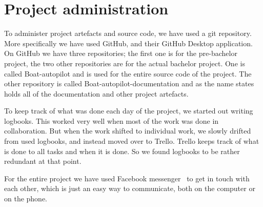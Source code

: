 \chapter{Project administration}
To administer project artefacts and source code, we have used a git repository. More specifically we have used GitHub\cite{github}, and their GitHub Desktop application\cite{github_desktop}. On GitHub we have three repositories; the first one is for the pre-bachelor project, the two other repositories are for the actual bachelor project. One is called Boat-autopilot and is used for the entire source code of the project. The other repository is called Boat-autopilot-documentation and as the name states holds all of the documentation and other project artefacts.

To keep track of what was done each day of the project, we started out writing logbooks. This worked very well when most of the work was done in collaboration. But when the work shifted to individual work, we slowly drifted from used logbooks, and instead moved over to Trello. Trello keeps track of what is done to all tasks and when it is done. So we found logbooks to be rather redundant at that point. 

For the entire project we have used Facebook messenger~\cite{facebook-messenger} to get in touch with each other, which is just an easy way to communicate, both on the computer or on the phone. 

 
%
